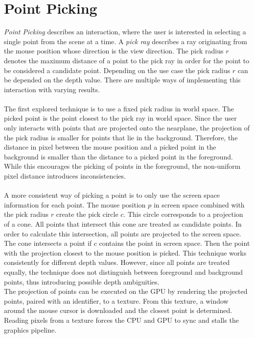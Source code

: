 \section{Point Picking}
\label{sec:picking}
\textit{Point Picking} describes an interaction, where the user is interested in selecting a single point from the scene at a time. A \textit{pick ray} describes a ray originating from the mouse position whose direction is the view direction. The pick radius $r$ denotes the maximum distance of a point to the pick ray in order for the point to be considered a candidate point. Depending on the use case the pick radius $r$ can be depended on the depth value. There are multiple ways of implementing this interaction with varying results. 
\\
\\
The first explored technique is to use a fixed pick radius in world space. The picked point is the point closest to the pick ray in world space. Since the user only interacts with points that are projected onto the nearplane, the projection of the pick radius is smaller for points that lie in the background. Therefore, the distance in pixel between the mouse position and a picked point in the background is smaller than the distance to a picked point in the foreground. While this encourages the picking of points in the foreground, the non-uniform pixel distance introduces inconsistencies. 
\\
\\
A more consistent way of picking a point is to only use the screen space information for each point. The mouse position $p$ in screen space combined with the pick radius $r$ create the pick circle $c$. This circle corresponds to a projection of a cone. All points that intersect this cone are treated as candidate points. In order to calculate this intersection, all points are projected to the screen space. The cone intersects a point if $c$ contains the point in screen space. Then the point with the projection closest to the mouse position is picked. This technique works consistently for different depth values. However, since all points are treated equally, the technique does not distinguish between foreground and background points, thus introducing possible depth ambiguities. 
\\
The projection of points can be executed on the GPU by rendering the projected points, paired with an identifier, to a texture. From this texture, a window around the mouse cursor is downloaded and the closest point is determined. Reading pixels from a texture forces the CPU and GPU to sync and stalls the graphics pipeline. 
